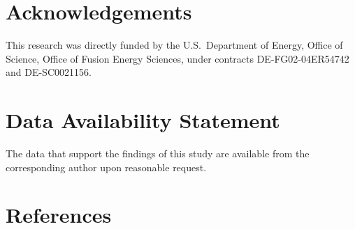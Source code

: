 \documentclass[12pt,prb,aps]{revtex4-1}
\begin{document}
\section*{Acknowledgements}
This research was directly funded by the U.S.\ Department of Energy, Office of Science, Office of Fusion Energy Sciences,  under  contracts DE-FG02-04ER54742 and DE-SC0021156. 

\section*{Data Availability Statement}
The data that support the findings of this study are available from the corresponding author upon reasonable request.

\section*{References}
\end{document}
